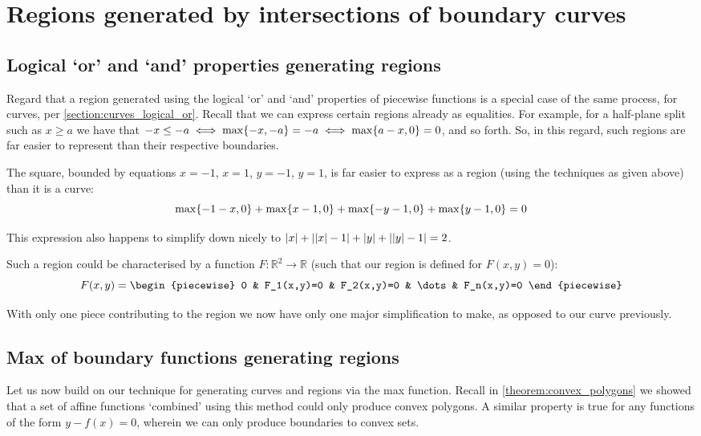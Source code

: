 \section{Regions generated by intersections of boundary curves}
\subsection{Logical `or' and `and' properties generating regions}
Regard that a region generated using the logical `or' and `and' properties of piecewise functions is a special case of the same process, for curves, per \autoref{section:curves_logical_or}. Recall that we can express certain regions already as equalities. For example, for a half-plane split such as $x\geq a$ we have that $-x\leq -a\iff\max\{-x,-a\}=-a\iff\max\{a-x,0\}=0$, and so forth. So, in this regard, such regions are far easier to represent than their respective boundaries.

\begin{example}
    The square, bounded by equations $x=-1$, $x=1$, $y=-1$, $y=1$, is far easier to express as a region (using the techniques as given above) than it is a curve:
    $$
        \max\{-1-x,0\}+\max\{x-1,0\}+\max\{-y-1,0\}+\max\{y-1,0\}=0
    $$

    This expression also happens to simplify down nicely to $\abs{x}+\abs{\abs{x}-1}+\abs{y}+\abs{\abs{y}-1}=2$.
\end{example}

Such a region could be characterised by a function $F:\mathbb{R}^2\to\mathbb{R}$ (such that our region is defined for $F(x,y)=0$):
$$
    F(x,y)=\begin{piecewise}
        0 & F_1(x,y)=0 & F_2(x,y)=0 & \dots & F_n(x,y)=0
    \end{piecewise}
$$

With only one piece contributing to the region we now have only one major simplification to make, as opposed to our curve previously.

\subsection{Max of boundary functions generating regions}
\label{section:max_boundary_region}
Let us now build on our technique for generating curves and regions via the max function. Recall in \autoref{theorem:convex_polygons} we showed that a set of affine functions `combined' using this method could only produce convex polygons. A similar property is true for any functions of the form $y-f(x)=0$, wherein we can only produce boundaries to convex sets.

